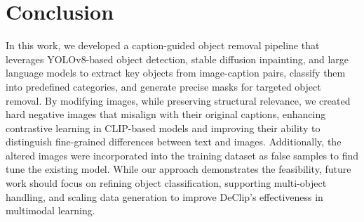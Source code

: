 \documentclass[11pt,letterpaper]{article}
\begin{document}
\section{Conclusion}
In this work, we developed a caption-guided object removal pipeline that leverages YOLOv8-based object detection, stable diffusion inpainting, and large language models to extract key objects from image-caption pairs, classify them into predefined categories, and generate precise masks for targeted object removal. By modifying images, while preserving structural relevance, we created hard negative images that misalign with their original captions, enhancing contrastive learning in CLIP-based models and improving their ability to distinguish fine-grained differences between text and images. Additionally, the altered images were incorporated into the training dataset as false samples to find tune the existing model. While our approach demonstrates the feasibility, future work should focus on refining object classification, supporting multi-object handling, and scaling data generation to improve DeClip’s effectiveness in multimodal learning.
\end{document}
